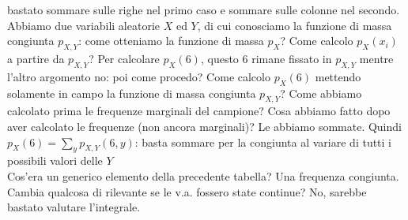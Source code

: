\documentclass{article}
\begin{document}
    bastato sommare sulle righe nel primo caso e sommare sulle colonne nel secondo. \\
    Abbiamo due variabili aleatorie $ X $ ed $ Y $, di cui conosciamo la funzione di massa congiunta $ p_{ X, Y } $: come otteniamo la funzione di massa $ p_X $? Come calcolo 
    $ p_X ( x_i ) $ a partire da $ p_{ X, Y } $? Per calcolare $ p_X ( 6 ) $, questo $ 6 $ rimane fissato in $ p_{ X, Y } $ mentre l'altro argomento no: poi come procedo? Come
    calcolo $ p_X ( 6 ) $ mettendo solamente in campo la funzione di massa congiunta $ p_{ X, Y } $? Come abbiamo calcolato prima le frequenze marginali del campione? Cosa
    abbiamo fatto dopo aver calcolato le frequenze (non ancora marginali)? Le abbiamo sommate. Quindi $ p_X ( 6 ) = \sum_y p_{ X, Y } ( 6, y ) $: basta sommare per la
    congiunta al variare di tutti i possibili valori delle $ Y $ \\
    Cos'era un generico elemento della precedente tabella? Una frequenza congiunta. \\
    Cambia qualcosa di rilevante se le v.a. fossero state continue? No, sarebbe bastato valutare l'integrale.
    
\end{document}
